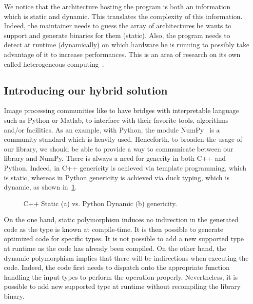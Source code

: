 We notice that the architecture hosting the program is both an information which is static and dynamic. This translates
the complexity of this information. Indeed, the maintainer needs to guess the array of architectures he wants to support
and generate binaries for them (static). Also, the program needs to detect at runtime (dynamically) on which hardware he
is running to possibly take advantage of it to increase performances. This is an area of research on its own called
heterogeneous computing~\parencite{wong.2019.heterogeneous,brown.2019.heterogeneous}.


\subsection{Introducing our hybrid solution}

Image processing communities like to have bridges with interpretable language such as Python or Matlab, to interface
with their favorite tools, algorithms and/or facilities. As an example, with Python, the module
NumPy~\cite{oliphant.2006.numpy} is a community standard which is heavily used. Henceforth, to broaden the usage of our
library, we should be able to provide a way to communicate between our library and NumPy. There is always a need for
genecity in both C++ and Python. Indeed, in C++ genericity is achieved via template programming, which is static,
whereas in Python genericity is achieved via duck typing, which is dynamic, as shown
in~\cref{fig:static.vs.dynamic.genericity}.

\begin{figure}[tbh]
  \centering
  \hfil
  \caption{C++ Static (a) vs. Python Dynamic (b) genericity.}
  \label{fig:static.vs.dynamic.genericity}
\end{figure}

On the one hand, static polymorphism induces no indirection in the generated code as the type is known at compile-time.
It is then possible to generate optimized code for specific types. It is not possible to add a new supported type at
runtime as the code has already been compiled. On the other hand, the dynamic polymorphism implies that there will be
indirections when executing the code. Indeed, the code first needs to dispatch onto the appropriate function handling
the input types to perform the operation properly. Nevertheless, it is possible to add new supported type at runtime
without recompiling the library binary.

